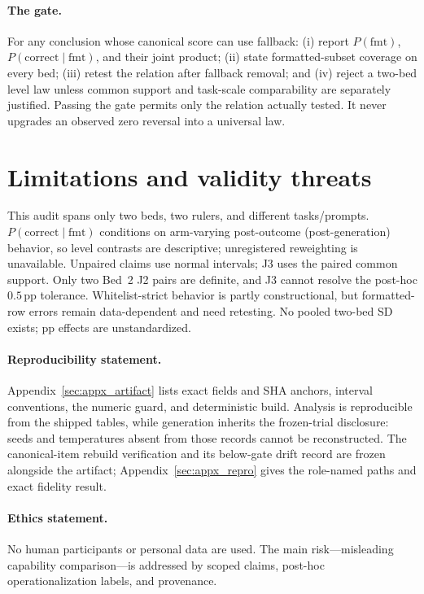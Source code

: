 \documentclass{article}
\newcommand{\Pfmt}{P(\mathrm{fmt})}
\newcommand{\PcFmt}{P(\mathrm{correct}\mid\mathrm{fmt})}
\newcommand{\pp}{\,\mathrm{pp}}
\begin{document}
\paragraph{The gate.}\label{sec:gate}
For any conclusion whose canonical score can use fallback: (i) report $\Pfmt$,
$\PcFmt$, and their joint product; (ii) state formatted-subset coverage on every
bed; (iii) retest the relation after fallback removal; and (iv) reject a
two-bed level law unless common support and task-scale comparability are
separately justified.
Passing the gate permits only the relation actually tested.  It never upgrades
an observed zero reversal into a universal law.

\section{Limitations and validity threats}
\label{sec:limitations}

This audit spans only two beds, two rulers, and different tasks/prompts.
$\PcFmt$ conditions on arm-varying post-outcome (post-generation) behavior, so level contrasts
are descriptive; unregistered reweighting is unavailable.  Unpaired claims
use normal intervals; J3 uses the paired common support.  Only two Bed~2 J2
pairs are definite, and J3 cannot resolve the post-hoc $0.5\pp$ tolerance.
Whitelist-strict behavior
is partly constructional, but formatted-row errors remain data-dependent and
need retesting.  No pooled two-bed SD exists; pp effects are unstandardized.

\paragraph{Reproducibility statement.}\label{sec:repro}
Appendix~\ref{sec:appx_artifact} lists exact fields and SHA anchors, interval
conventions, the
numeric guard, and deterministic build.  Analysis is reproducible from the
shipped tables, while generation inherits the frozen-trial disclosure: seeds
and temperatures absent from those records cannot be reconstructed.  The
canonical-item rebuild verification and its below-gate drift record are frozen
alongside the artifact; Appendix~\ref{sec:appx_repro} gives the role-named
paths and exact fidelity result.

\paragraph{Ethics statement.} No human participants or personal data are
used.  The main risk---misleading capability comparison---is addressed by
scoped claims, post-hoc operationalization labels, and provenance.
\end{document}
